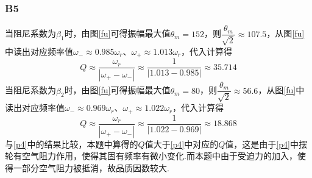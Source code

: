 \documentclass[12pt,a4paper,oneside,left=3.18,right=3.18,top=2.54,bottom=2.54]{ctexart}
\begin{document}
		\subsubsection{B5}
			当阻尼系数为$\beta_1$时，由图\ref{fu}可得振幅最大值$\theta_m=152$，则$\dfrac{\theta_m}{\sqrt{2}}\approx107.5$，从图\ref{fu}中读出对应频率值$\omega_-\approx0.985\omega_r$、$\omega_+\approx1.013\omega_r$，代入计算得
			$$Q\approx\dfrac{\omega_r}{|\omega_+-\omega_-|}\approx\dfrac{1}{|1.013-0.985|}\approx35.714$$
			\indent
			当阻尼系数为$\beta_2$时，由图\ref{fu}可得振幅最大值$\theta_m=80$，则$\dfrac{\theta_m}{\sqrt{2}}\approx56.6$，从图\ref{fu}中读出对应频率值$\omega_-\approx0.969\omega_r$、$\omega_+\approx1.022\omega_r$，代入计算得
			$$Q\approx\dfrac{\omega_r}{|\omega_+-\omega_-|}\approx\dfrac{1}{|1.022-0.969|}\approx18.868$$
			与\ref{p4}中的结果比较，本题中算得的$Q$值大于\ref{p4}中对应的$Q$值，这是由于\ref{p4}中摆轮有空气阻力作用，使得其固有频率有微小变化.而本题中由于受迫力的加入，使得一部分空气阻力被抵消，故品质因数较大.
\end{document}
